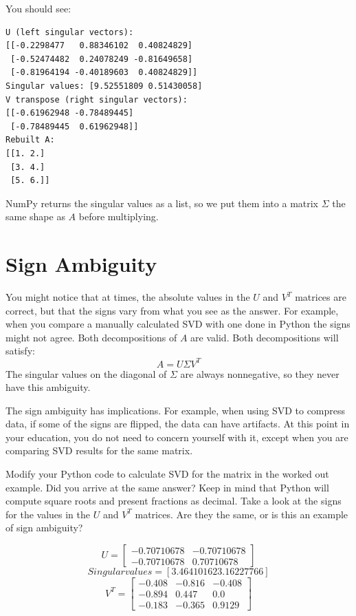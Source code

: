You should see:
\begin{verbatim}
U (left singular vectors):
[[-0.2298477   0.88346102  0.40824829]
 [-0.52474482  0.24078249 -0.81649658]
 [-0.81964194 -0.40189603  0.40824829]]
Singular values: [9.52551809 0.51430058]
V transpose (right singular vectors):
[[-0.61962948 -0.78489445]
 [-0.78489445  0.61962948]]
Rebuilt A:
[[1. 2.]
 [3. 4.]
 [5. 6.]]
\end{verbatim}
NumPy returns the singular values as a list, so we put them into a matrix
$\Sigma$ the same shape as $A$ before multiplying.

\section{Sign Ambiguity}
You might notice that at times, the absolute values in the $U$ and $V^T$ matrices are correct, but that the signs vary from what you see as the answer. For example, when you compare a manually calculated SVD with one done in Python the signs might not agree. Both decompositions of $A$ are valid. Both decompositions will satisfy:
$$A = U \Sigma V^T$$
The singular values on the diagonal of $\Sigma$ are always nonnegative, so they never have this ambiguity. 

The sign ambiguity has implications. For example, when using SVD to compress data, if some of the signs are flipped, the data can have artifacts. At this point in your education, you do not need to concern yourself with it, except when you are comparing SVD results for the same matrix.

\begin{Exercise}[title={Singular Value Decomposition}, label=svd]
Modify your Python code to calculate SVD for the matrix in the worked out example. Did you arrive at the same answer? Keep in mind that Python will compute square roots and present fractions as decimal. Take a look at the signs for the values in the $U$ and $V^T$ matrices. Are they the same, or is this an example of sign ambiguity? 
\end{Exercise}
\begin{Answer}[ref=svd]
$$U = 
\begin{bmatrix}
-0.70710678 & -0.70710678  \\
 -0.70710678 & 0.70710678 
\end{bmatrix}
$$
$$Singular values = [3.46410162 3.16227766]
$$
$$V^T =
\begin{bmatrix}
 -0.408 & -0.816 & -0.408  \\
 -0.894 & 0.447 & 0.0  \\
 -0.183 & -0.365  & 0.9129 
\end{bmatrix}
$$
\end{Answer}

